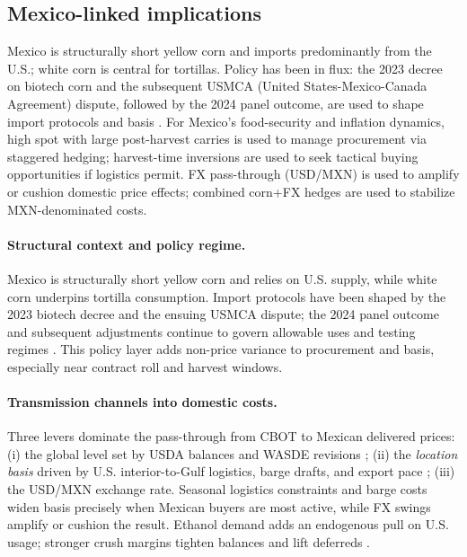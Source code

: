 \documentclass[11pt,a4paper]{article} %
\begin{document}
\subsection{Mexico-linked implications}
Mexico is structurally short yellow corn and imports predominantly from the U.S.; white corn is central for tortillas. Policy has been in flux: the 2023 decree on biotech corn and the subsequent USMCA (United States-Mexico-Canada Agreement) dispute, followed by the 2024 panel outcome, are used to shape import protocols and basis \citep{fas_mexico_decree_2023,ustr_usmca_biotech_2023,ustr_usmca_biotech_win_2024,reuters_mexico_gm_ban_2025,fas_mexico_grain_annual_2025}. For Mexico's food-security and inflation dynamics, high spot with large post-harvest carries is used to manage procurement via staggered hedging; harvest-time inversions are used to seek tactical buying opportunities if logistics permit. FX pass-through (USD/MXN) is used to amplify or cushion domestic price effects; combined corn+FX hedges are used to stabilize MXN-denominated costs.

\paragraph{Structural context and policy regime.}
Mexico is structurally short yellow corn and relies on U.S. supply, while white corn underpins tortilla consumption. Import protocols have been shaped by the 2023 biotech decree and the ensuing USMCA dispute; the 2024 panel outcome and subsequent adjustments continue to govern allowable uses and testing regimes \citep{fas_mexico_decree_2023,ustr_usmca_biotech_2023,ustr_usmca_biotech_win_2024,reuters_mexico_gm_ban_2025,fas_mexico_grain_annual_2025}. This policy layer adds non-price variance to procurement and basis, especially near contract roll and harvest windows.

\paragraph{Transmission channels into domestic costs.}
Three levers dominate the pass-through from CBOT to Mexican delivered prices:
(i) the global level set by USDA balances and WASDE revisions \citep{usda_wasde,ers_feedgrains_outlook};
(ii) the \emph{location basis} driven by U.S. interior-to-Gulf logistics, barge drafts, and export pace \citep{ams_gtr_2023};
(iii) the USD/MXN exchange rate. Seasonal logistics constraints and barge costs widen basis precisely when Mexican buyers are most active, while FX swings amplify or cushion the result. Ethanol demand adds an endogenous pull on U.S. usage; stronger crush margins tighten balances and lift deferreds \citep{ers_ethanol_40}.
\end{document}
